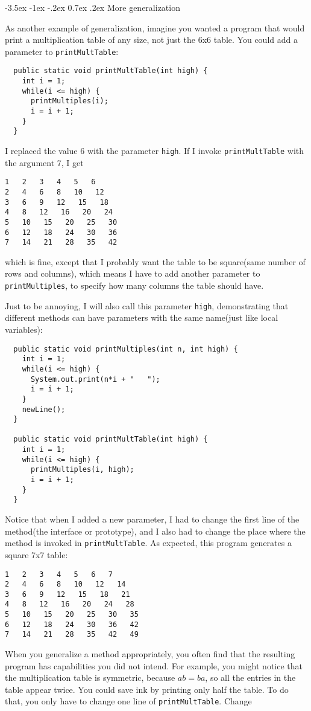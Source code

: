 \documentclass{book}
\makeatletter
\renewcommand{\section}{\@startsection 
    {section} {1} {0mm}%
    {-3.5ex \@plus -1ex \@minus -.2ex}%
    {0.7ex \@plus.2ex}%
    {\normalfont\Large\bfseries}}
\makeatother
\begin{document}

\section{More generalization}

As another example of generalization, imagine you wanted
a program that would print a multiplication table of any
size, not just the 6x6 table.  You could add a parameter to
{\tt printMultTable}:

\begin{verbatim}
  public static void printMultTable(int high) {
    int i = 1;
    while(i <= high) {
      printMultiples(i);
      i = i + 1;
    }
  }
\end{verbatim}
%
I replaced the value 6 with the parameter {\tt high}.  If I
invoke {\tt printMultTable} with the argument 7, I get

\begin{verbatim}
1   2   3   4   5   6   
2   4   6   8   10   12   
3   6   9   12   15   18   
4   8   12   16   20   24   
5   10   15   20   25   30   
6   12   18   24   30   36   
7   14   21   28   35   42   
\end{verbatim}
%
which is fine, except that I probably want the table to
be square(same number of rows and columns), which means
I have to add another parameter to {\tt printMultiples},
to specify how many columns the table should have.

Just to be annoying, I will also call this parameter {\tt high},
demonstrating that different methods can have parameters
with the same name(just like local variables):

\begin{verbatim}
  public static void printMultiples(int n, int high) {
    int i = 1;
    while(i <= high) {
      System.out.print(n*i + "   ");
      i = i + 1;
    }    
    newLine();
  }

  public static void printMultTable(int high) {
    int i = 1;
    while(i <= high) {
      printMultiples(i, high);
      i = i + 1;
    }
  }
\end{verbatim}
%
Notice that when I added a new parameter, I had to change the first
line of the method(the interface or prototype), and I also had to
change the place where the method is invoked in {\tt printMultTable}.
As expected, this program generates a square 7x7 table:

\begin{verbatim}
1   2   3   4   5   6   7   
2   4   6   8   10   12   14   
3   6   9   12   15   18   21   
4   8   12   16   20   24   28   
5   10   15   20   25   30   35   
6   12   18   24   30   36   42   
7   14   21   28   35   42   49
\end{verbatim}
%
When you generalize a method appropriately, you often find
that the resulting program has capabilities you did not intend.
For example, you might notice that the multiplication table
is symmetric, because $ab = ba$, so all the entries in the
table appear twice.  You could save ink by printing only
half the table.  To do that, you only have to change one
line of {\tt printMultTable}.  Change
\end{document}
